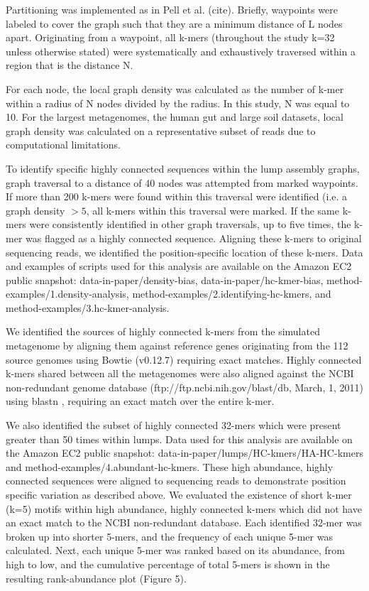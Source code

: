 \documentclass[10pt]{article}
\begin{document}

Partitioning was implemented as in Pell et al. (cite).  Briefly,
waypoints were labeled to cover the graph such that they are a minimum
distance of L nodes apart. Originating from a waypoint, all k-mers
(throughout the study k=32 unless otherwise stated) were
systematically and exhaustively traversed within a region that is the
distance N.

For each node, the local graph density was calculated as the number of
k-mer within a radius of N nodes divided by the radius.  In this
study, N was equal to 10.  For the largest metagenomes, the human gut
and large soil datasets, local graph density was calculated on a
representative subset of reads due to computational limitations.

To identify specific highly connected sequences within the lump
assembly graphs, graph traversal to a distance of 40 nodes was
attempted from marked waypoints.  If more than 200 k-mers were found
within this traversal were identified (i.e. a graph density $> 5$, all
k-mers within this traversal were marked. If the same k-mers were consistently identified
in other graph traversals, up to five times, the k-mer was flagged as
a highly connected sequence.  Aligning these k-mers to original
sequencing reads, we identified the position-specific location of
these k-mers.  Data and examples of scripts used for this analysis are
available on the Amazon EC2 public snapshot:
data-in-paper/density-bias, data-in-paper/hc-kmer-bias,
method-examples/1.density-analysis,
method-examples/2.identifying-hc-kmers, and
method-examples/3.hc-kmer-analysis.

We identified the sources of highly connected k-mers from the
simulated metagenome by aligning them against reference genes
originating from the 112 source genomes using Bowtie (v0.12.7)
requiring exact matches.  Highly connected k-mers shared between all
the metagenomes were also aligned against the NCBI non-redundant
genome database (ftp://ftp.ncbi.nih.gov/blast/db, March, 1, 2011)
using blastn \cite{Altschul:1990p1335}, requiring an exact match over
the entire k-mer.

We also identified the subset of highly connected 32-mers which were
present greater than 50 times within lumps. Data used for this
analysis are available on the Amazon EC2 public snapshot:
data-in-paper/lumps/HC-kmers/HA-HC-kmers and
method-examples/4.abundant-hc-kmers. These high abundance, highly
connected sequences were aligned to sequencing reads to demonstrate
position specific variation as described above.  We evaluated the
existence of short k-mer (k=5) motifs within high abundance, highly
connected k-mers which did not have an exact match to the NCBI
non-redundant database.  Each identified 32-mer was broken up into
shorter 5-mers, and the frequency of each unique 5-mer was calculated.
Next, each unique 5-mer was ranked based on its abundance, from high
to low, and the cumulative percentage of total 5-mers is shown in the
resulting rank-abundance plot (Figure 5).
  
\end{document}
